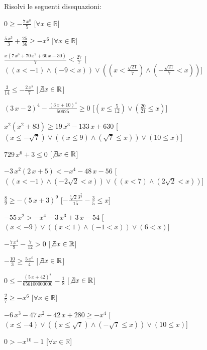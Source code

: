 \begin{esercizio}\label{ese:03.1}
Risolvi le seguenti disequazioni:
\begin{enumeratea}
\item $0\geq -{\frac {7\,{x}^{8}}{5}}$ 
\hfill [$\forall x \in \mathbb{R}$]
\item ${\frac {5\,{x}^{3}}{3}}+{\frac {25}{36}}\geq -{x}^{6}$ 
\hfill [$\forall x \in \mathbb{R}$]
\item ${\frac {x \left( 7\,{x}^{3}+70\,{x}^{2}+60\,x-30 \right) }{7}}<{\frac 
{27}{7}}$ 
\hfill [$((x<-1) \wedge (-9<x))\vee ((x<{\frac {\sqrt {21}}{7}}) \wedge (-{\frac 
{\sqrt {21}}{7}}<x))$]
\item ${\frac {3}{14}}\leq -{\frac {2\,{x}^{8}}{7}}$ 
\hfill [$\not\exists x \in \mathbb{R}$]
\item $ \left( 3\,x-2 \right) ^{4}-{\frac { \left( 3\,x+10 \right) 
^{4}}{50625}}\geq 0$ 
\hfill [$(x\leq {\frac {5}{12}})\vee ({\frac {20}{21}}\leq x)$]
\item ${x}^{2} \left( {x}^{2}+83 \right) \geq 19\,{x}^{3}-133\,x+630$ 
\hfill [$(x\leq -\sqrt {7})\vee ((x\leq 9) \wedge (\sqrt {7}\leq x))\vee (10\leq 
x)$]
\item $729\,{x}^{6}+3\leq 0$ 
\hfill [$\not\exists x \in \mathbb{R}$]
\item $-3\,{x}^{2} \left( 2\,x+5 \right) <-{x}^{4}-48\,x-56$ 
\hfill [$((x<-1) \wedge (-2 \sqrt {2}<x))\vee ((x<7) \wedge (2 \sqrt {2}<x))$]
\item ${\frac {8}{9}}\geq - \left( 5\,x+3 \right) ^{9}$ 
\hfill [$-{\frac {\sqrt [3]{2}{3}^{{\frac {7}{9}}}}{15}}-{\frac {3}{5}}\leq x$]
\item $-55\,{x}^{2}>-{x}^{4}-3\,{x}^{3}+3\,x-54$ 
\hfill [$(x<-9)\vee ((x<1) \wedge (-1<x))\vee (6<x)$]
\item $-{\frac {7\,{x}^{4}}{9}}-{\frac {7}{12}}>0$ 
\hfill [$\not\exists x \in \mathbb{R}$]
\item $-{\frac {10}{3}}\geq {\frac {5\,{x}^{6}}{4}}$ 
\hfill [$\not\exists x \in \mathbb{R}$]
\item $0\leq -{\frac { \left( 5\,x+42 \right) ^{8}}{656100000000}}-{\frac 
{1}{8}}$ 
\hfill [$\not\exists x \in \mathbb{R}$]
\item ${\frac {2}{7}}\geq -{x}^{6}$ 
\hfill [$\forall x \in \mathbb{R}$]
\item $-6\,{x}^{3}-47\,{x}^{2}+42\,x+280\geq -{x}^{4}$ 
\hfill [$(x\leq -4)\vee ((x\leq \sqrt {7}) \wedge (-\sqrt {7}\leq x))\vee 
(10\leq x)$]
\item $0>-{x}^{10}-1$ 
\hfill [$\forall x \in \mathbb{R}$]

\end{enumeratea}
\end{esercizio}
